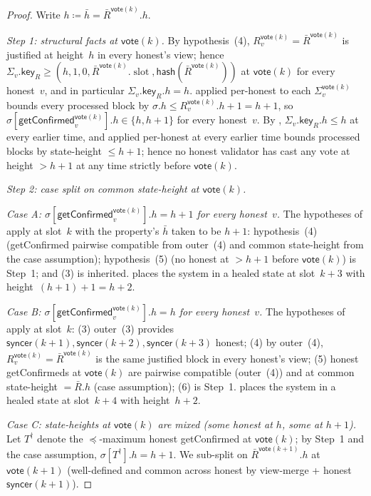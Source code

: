 \documentclass{article}
\newcommand{\slot}[0]{\ensuremath{\operatorname{\mathrm{slot}}}}
\newcommand{\hash}{\mathsf{hash}}
\newcommand{\key}{\mathsf{key}}
\newcommand{\syncer}{\mathsf{syncer}}
\newcommand{\vote}{\mathsf{vote}}
\newcommand{\comm}[1]{\bar{#1}}
\newcommand{\getConfirmed}{\textsf{getConfirmed}\xspace}
\theoremstyle{plain}
\theoremstyle{definition}
\theoremstyle{remark}
\begin{document}
\begin{proof}
Write $h \coloneqq \comm{h} = \comm{R}^{\vote(k)}.h$.

\emph{Step 1: structural facts at $\vote(k)$.}
By hypothesis~(4), $R_v^{\vote(k)} = \comm{R}^{\vote(k)}$ is justified at height~$h$ in every honest's view; hence $\Sigma_v.\key_R \geq (h, 1, 0, \comm{R}^{\vote(k)}.\slot, \hash(\comm{R}^{\vote(k)}))$ at $\vote(k)$ for every honest~$v$, and in particular $\Sigma_v.\key_R.h = h$.  applied per-honest to each $\Sigma_v^{\vote(k)}$ bounds every processed block by $\sigma.h \leq R_v^{\vote(k)}.h + 1 = h + 1$, so $\sigma[\getConfirmed_v^{\vote(k)}].h \in \{h, h+1\}$ for every honest~$v$. By , $\Sigma_v.\key_R.h \leq h$ at every earlier time, and  applied per-honest at every earlier time bounds processed blocks by state-height $\leq h+1$; hence no honest validator has cast any vote at height $> h+1$ at any time strictly before $\vote(k)$.

\emph{Step 2: case split on common state-height at $\vote(k)$.}

\emph{Case A: $\sigma[\getConfirmed_v^{\vote(k)}].h = h+1$ for every honest~$v$.}
The hypotheses of  apply at slot~$k$ with the property's $\comm{h}$ taken to be $h+1$: hypothesis~(4) (\getConfirmed pairwise compatible from outer~(4) and common state-height from the case assumption); hypothesis~(5) (no honest at $> h+1$ before $\vote(k)$) is Step~1; and (3) is inherited.  places the system in a healed state at slot~$k+3$ with height~$(h+1)+1 = h+2$.

\emph{Case B: $\sigma[\getConfirmed_v^{\vote(k)}].h = h$ for every honest~$v$.}
The hypotheses of  apply at slot~$k$: (3) outer~(3) provides $\syncer(k+1), \syncer(k+2), \syncer(k+3)$ honest; (4) by outer~(4), $R_v^{\vote(k)} = \comm{R}^{\vote(k)}$ is the same justified block in every honest's view; (5) honest \getConfirmed{}s at $\vote(k)$ are pairwise compatible (outer~(4)) and at common state-height $= \comm{R}.h$ (case assumption); (6) is Step~1.  places the system in a healed state at slot~$k+4$ with height~$h+2$.

\emph{Case C: state-heights at $\vote(k)$ are mixed (some honest at $h$, some at $h+1$).}
Let $T^\dagger$ denote the $\preceq$-maximum honest \getConfirmed{} at $\vote(k)$; by Step~1 and the case assumption, $\sigma[T^\dagger].h = h+1$. We sub-split on $\comm{R}^{\vote(k+1)}.h$ at $\vote(k+1)$ (well-defined and common across honest by view-merge + honest $\syncer(k+1)$).


\end{proof}
\end{document}
